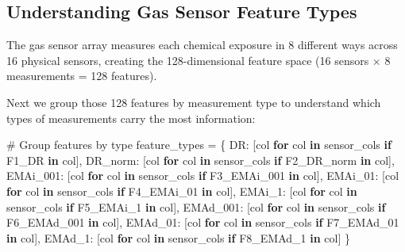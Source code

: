 \documentclass[
  letterpaper,
  DIV=11,
  numbers=noendperiod]{scrartcl}
\newenvironment{Shaded}{\begin{snugshade}}{\end{snugshade}}
\newcommand{\CommentTok}[1]{\textcolor[rgb]{0.37,0.37,0.37}{#1}}
\newcommand{\ControlFlowTok}[1]{\textcolor[rgb]{0.00,0.23,0.31}{\textbf{#1}}}
\newcommand{\KeywordTok}[1]{\textcolor[rgb]{0.00,0.23,0.31}{\textbf{#1}}}
\newcommand{\NormalTok}[1]{\textcolor[rgb]{0.00,0.23,0.31}{#1}}
\newcommand{\OperatorTok}[1]{\textcolor[rgb]{0.37,0.37,0.37}{#1}}
\newcommand{\StringTok}[1]{\textcolor[rgb]{0.13,0.47,0.30}{#1}}
\renewenvironment{Shaded}{%
  \begin{tcolorbox}[%
    enhanced,%
    colback=codebg,%
    colframe=codebg,%
    borderline west={3pt}{0pt}{sectionblue},%
    fontupper=\small\ttfamily,%
    boxrule=0pt,%
    arc=0pt,%
    boxsep=5pt,%
    left=2mm,%
    right=2mm,%
    top=2mm,%
    bottom=2mm%
  ]%
}{%
  \end{tcolorbox}%
}
\begin{document}
\subsection{Understanding Gas Sensor Feature
Types}\label{understanding-gas-sensor-feature-types}

The gas sensor array measures each chemical exposure in 8 different ways
across 16 physical sensors, creating the 128-dimensional feature space
(16 sensors × 8 measurements = 128 features).

Next we group those 128 features by measurement type to understand which
types of measurements carry the most information:

\begin{Shaded}
\begin{Highlighting}[]
\CommentTok{\# Group features by type}
\NormalTok{feature\_types }\OperatorTok{=}\NormalTok{ \{}
    \StringTok{\textquotesingle{}DR\textquotesingle{}}\NormalTok{: [col }\ControlFlowTok{for}\NormalTok{ col }\KeywordTok{in}\NormalTok{ sensor\_cols }\ControlFlowTok{if} \StringTok{\textquotesingle{}F1\_DR\textquotesingle{}} \KeywordTok{in}\NormalTok{ col],}
    \StringTok{\textquotesingle{}DR\_norm\textquotesingle{}}\NormalTok{: [col }\ControlFlowTok{for}\NormalTok{ col }\KeywordTok{in}\NormalTok{ sensor\_cols }\ControlFlowTok{if} \StringTok{\textquotesingle{}F2\_DR\_norm\textquotesingle{}} \KeywordTok{in}\NormalTok{ col],}
    \StringTok{\textquotesingle{}EMAi\_001\textquotesingle{}}\NormalTok{: [col }\ControlFlowTok{for}\NormalTok{ col }\KeywordTok{in}\NormalTok{ sensor\_cols }\ControlFlowTok{if} \StringTok{\textquotesingle{}F3\_EMAi\_001\textquotesingle{}} \KeywordTok{in}\NormalTok{ col],}
    \StringTok{\textquotesingle{}EMAi\_01\textquotesingle{}}\NormalTok{: [col }\ControlFlowTok{for}\NormalTok{ col }\KeywordTok{in}\NormalTok{ sensor\_cols }\ControlFlowTok{if} \StringTok{\textquotesingle{}F4\_EMAi\_01\textquotesingle{}} \KeywordTok{in}\NormalTok{ col],}
    \StringTok{\textquotesingle{}EMAi\_1\textquotesingle{}}\NormalTok{: [col }\ControlFlowTok{for}\NormalTok{ col }\KeywordTok{in}\NormalTok{ sensor\_cols }\ControlFlowTok{if} \StringTok{\textquotesingle{}F5\_EMAi\_1\textquotesingle{}} \KeywordTok{in}\NormalTok{ col],}
    \StringTok{\textquotesingle{}EMAd\_001\textquotesingle{}}\NormalTok{: [col }\ControlFlowTok{for}\NormalTok{ col }\KeywordTok{in}\NormalTok{ sensor\_cols }\ControlFlowTok{if} \StringTok{\textquotesingle{}F6\_EMAd\_001\textquotesingle{}} \KeywordTok{in}\NormalTok{ col],}
    \StringTok{\textquotesingle{}EMAd\_01\textquotesingle{}}\NormalTok{: [col }\ControlFlowTok{for}\NormalTok{ col }\KeywordTok{in}\NormalTok{ sensor\_cols }\ControlFlowTok{if} \StringTok{\textquotesingle{}F7\_EMAd\_01\textquotesingle{}} \KeywordTok{in}\NormalTok{ col],}
    \StringTok{\textquotesingle{}EMAd\_1\textquotesingle{}}\NormalTok{: [col }\ControlFlowTok{for}\NormalTok{ col }\KeywordTok{in}\NormalTok{ sensor\_cols }\ControlFlowTok{if} \StringTok{\textquotesingle{}F8\_EMAd\_1\textquotesingle{}} \KeywordTok{in}\NormalTok{ col]}
\NormalTok{\}}


\end{Highlighting}
\end{Shaded}
\end{document}
